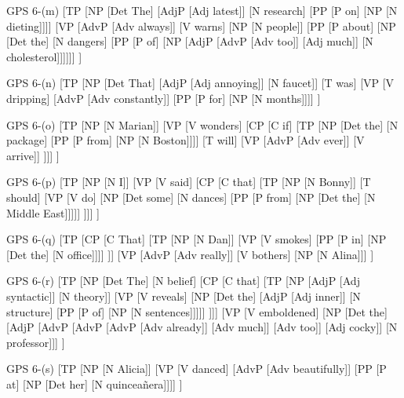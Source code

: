 \documentclass{article}
\begin{document}
\bigskip
\noindent
\begin{gpstree}[\textwidth]{GPS 6-(m)}
[TP
  [NP [Det The] [AdjP [Adj latest]] [N research] [PP [P on] [NP [N dieting]]]]
  [VP [AdvP [Adv always]] [V warns] [NP [N people]] [PP [P about] [NP [Det the] [N dangers] [PP [P of] [NP [AdjP [AdvP [Adv too]] [Adj much]] [N cholesterol]]]]]]
] 
\end{gpstree}

\bigskip
\noindent
\begin{gpstree}[\textwidth]{GPS 6-(n)}
[TP
  [NP [Det That] [AdjP [Adj annoying]] [N faucet]]
  [T was]
  [VP [V dripping] [AdvP [Adv constantly]] [PP [P for] [NP [N months]]]]
] 
\end{gpstree}

\newpage
\noindent
\begin{gpstree}[\textwidth]{GPS 6-(o)}
[TP
  [NP [N Marian]]
  [VP [V wonders] [CP [C if] 
  [TP 
    [NP [Det the] [N package] [PP [P from] [NP [N Boston]]]]
    [T will]
    [VP [AdvP [Adv ever]] [V arrive]]
  ]]]
] 
\end{gpstree}

\bigskip
\noindent
\begin{gpstree}[\textwidth]{GPS 6-(p)}
[TP
  [NP [N I]]
  [VP [V said] [CP [C that] 
  [TP
    [NP [N Bonny]]
    [T should]
    [VP [V do] [NP [Det some] [N dances] [PP [P from] [NP [Det the] [N {Middle East}]]]]]
  ]]]
] 
\end{gpstree}

\newpage
\noindent
\begin{gpstree}[\textwidth]{GPS 6-(q)}
[TP
  [CP [C That] 
  [TP
    [NP [N Dan]]
    [VP [V smokes] [PP [P in] [NP [Det the] [N office]]]]
  ]]
  [VP [AdvP [Adv really]] [V bothers] [NP [N Alina]]]
] 
\end{gpstree}

\bigskip
\noindent
\begin{gpstree}[\textwidth]{GPS 6-(r)}
[TP
  [NP [Det The] [N belief] [CP [C that] 
  [TP 
    [NP [AdjP [Adj syntactic]] [N theory]]
    [VP [V reveals] [NP [Det the] [AdjP [Adj inner]] [N structure] [PP [P of] [NP [N sentences]]]]] 
  ]]]
  [VP [V emboldened] [NP [Det the] [AdjP [AdvP [AdvP [AdvP [Adv already]] [Adv much]] [Adv too]] [Adj cocky]] [N professor]]]
] 
\end{gpstree}

\bigskip
\noindent
\begin{gpstree}[\textwidth]{GPS 6-(s)}
[TP
  [NP [N Alicia]]
  [VP [V danced] [AdvP [Adv beautifully]] [PP [P at] [NP [Det her] [N quincea\~nera]]]]
] 
\end{gpstree}
\end{document}
